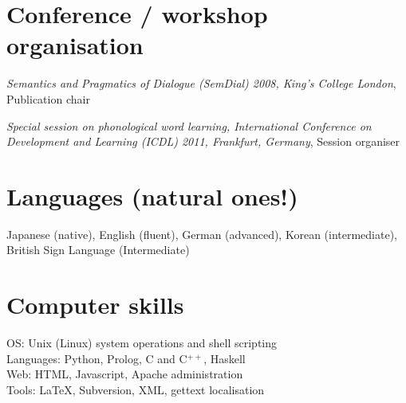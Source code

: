 \documentclass[a4paper]{article}
\renewenvironment{itemize}{
  \begin{list}{}{
    \setlength{\leftmargin}{1.5em}
  }
}{
  \end{list}
}
\begin{document}
\vspace{-.6cm}

\section*{Conference / workshop organisation}
\begin{itemize}
\item {\em Semantics and Pragmatics of Dialogue (SemDial) 2008, King's College London}, Publication chair
\item  {\em Special session on phonological word learning, International
    Conference on Development and Learning (ICDL) 2011, Frankfurt,
    Germany}, Session organiser

\end{itemize}

\vspace{-.5cm}






\section*{Languages (natural ones!)}

Japanese (native), English (fluent), German (advanced), Korean (intermediate), British Sign Language (Intermediate)

\vspace{-.3cm}

\section*{Computer skills}

OS: Unix (Linux) system operations and shell scripting\\
Languages: Python, Prolog, C and C$^{++}$, Haskell\\
Web: HTML, Javascript, Apache administration\\
Tools: \LaTeX, Subversion, XML, gettext localisation
\end{document}
